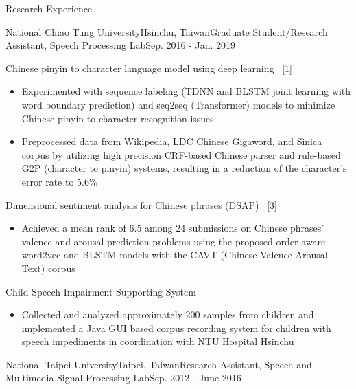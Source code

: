 \documentclass{resume_short} %
\begin{document}
\begin{rSection}{Research Experience}
    \begin{rSubsection}{National Chiao Tung University}{Hsinchu, Taiwan}{Graduate Student/Research Assistant, Speech Processing Lab}{Sep. 2016 - Jan. 2019}
        \item Chinese pinyin to character language model using deep learning ~[1]
        \begin{itemize}[label=$-$]
            \setlength \itemsep{-0.5em}
            \item Experimented with sequence labeling (TDNN and BLSTM joint learning with word boundary prediction) and seq2seq (Transformer) models to minimize Chinese pinyin to character recognition issues
            \item Preprocessed data from Wikipedia, LDC Chinese Gigaword, and Sinica corpus by utilizing high precision CRF-based Chinese parser and rule-based G2P (character to pinyin) systems, resulting in a reduction of the character’s error rate to 5.6\%
        \end{itemize}\vspace {0.5em}
        \item Dimensional sentiment analysis for Chinese phrases (DSAP) ~[3] 
        \begin{itemize}[label=$-$]
            \setlength \itemsep{-0.5em}
            \item Achieved a mean rank of 6.5 among 24 submissions on Chinese phrases’ valence and arousal prediction problems using the proposed order-aware word2vec and BLSTM models with the CAVT (Chinese Valence-Arousal Text) corpus
        \end{itemize}\vspace {0.5em}
        \item Child Speech Impairment Supporting System
        \begin{itemize}[label=$-$]
            \setlength \itemsep{-0.5em}
            \item Collected and analyzed approximately 200 samples from children and implemented a Java GUI based corpus recording system for children with speech impediments in coordination with NTU Hospital Hsinchu
        \end{itemize}\vspace {0.5em}
    \end{rSubsection}
    \begin{rSubsection}{National Taipei University}{Taipei, Taiwan}{Research Assistant, Speech and Multimedia Signal Processing Lab}{Sep. 2012 - June 2016}

\end{rSubsection}
\end{rSection}
\end{document}
